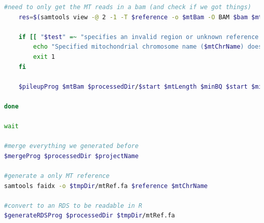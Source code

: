 \begin{lstlisting}[language=bash, caption=Preprocessing of mitochondrial reads and variants for analysis in R, label={lst-cascadeAppendix:mitoPreProcessing}]
    #need to only get the MT reads in a bam (and check if we got things)
    res=$(samtools view -@ 2 -1 -T $reference -o $mtBam -O BAM $bam $mtChrName --write-index 2>&1)

    if [[ "$test" =~ "specifies an invalid region or unknown reference. Continue anyway." ]]; then
        echo "Specified mitochondrial chromosome name ($mtChrName) does not exist in bam ($bam)"
        exit 1
    fi

    $pileupProg $mtBam $processedDir/$start $mtLength $minBQ $start $minMQ &

done

wait

#merge everything we generated before
$mergeProg $processedDir $projectName

#generate a only MT reference
samtools faidx -o $tmpDir/mtRef.fa $reference $mtChrName

#convert to an RDS to be readable in R
$generateRDSProg $processedDir $tmpDir/mtRef.fa

\end{lstlisting}


